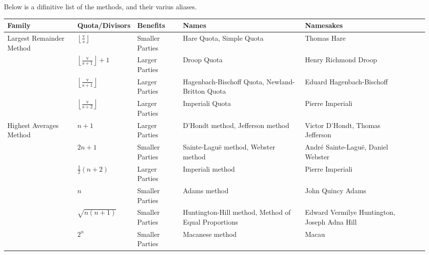\documentclass{article}
\begin{document}
    Below is a difinitive list of the methods, and their varius aliases.\\

    \begin{adjustbox}{center}
        \begin{tabular}{ |l|l|l|l|l|l|l| }
            \hline
            Family & Quota/Divisors & Benefits & Names & Namesakes \\
            \hline
            \multirow{2}{*}{Largest Remainder Method} & 
            $ \left \lfloor \frac{\text{v}}{\text{s}} \right \rfloor $ & 
            Smaller Parties & 
            Hare Quota, Simple Quota & 
            Thomas Hare\\
            \cline{2-5}
            & 
            $ \left \lfloor \frac{\text{v}}{\text{s} + 1} \right \rfloor + 1 $ & 
            Larger Parties &
            Droop Quota &
            Henry Richmond Droop\\
            \cline{2-5}
            & 
            $ \left \lfloor \frac{\text{v}}{\text{s} + 1} \right \rfloor $ & 
            Larger Parties &
            Hagenbach-Bischoff Quota, Newland-Britton Quota &
            Eduard Hagenbach-Bischoff\\
            \cline{2-5}
            & 
            $ \left \lfloor \frac{\text{v}}{\text{s} + 2} \right \rfloor $ & 
            Larger Parties &
            Imperiali Quota &
            Pierre Imperiali\\
            \hline
            \multirow{2}{*}{Highest Averages Method} & 
            $ n + 1 $ & 
            Larger Parties & 
            D'Hondt method, Jefferson method & 
            Victor D'Hondt, Thomas Jefferson\\
            \cline{2-5}
            & 
            $ 2n + 1 $ & 
            Smaller Parties &
            Sainte-Laguë method, Webster method &
            André Sainte-Laguë, Daniel Webster\\
            \cline{2-5}
            & 
            $ \frac{1}{2}(n + 2) $ & 
            Larger Parties &
            Imperiali method &
            Pierre Imperiali\\
            \cline{2-5}
            & 
            $ n $ & 
            Smaller Parties &
            Adams method &
            John Quincy Adams\\
            \cline{2-5}
            & 
            $ \sqrt{n(n + 1)} $ & 
            Smaller Parties &
            Huntington-Hill method, Method of Equal Proportions &
            Edward Vermilye Huntington, Joseph Adna Hill\\
            \cline{2-5}
            & 
            $ 2^n $
            & 
            Smaller Parties &
            Macanese method &
            Macau\\
            \hline
        \end{tabular}
    \end{adjustbox}
\end{document}
